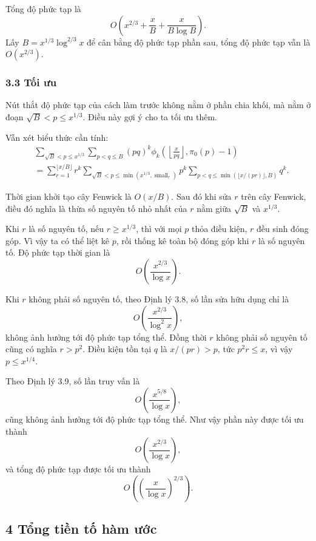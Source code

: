 \documentclass[11pt]{article}
\begin{document}
Tổng độ phức tạp là
\[
  O\left(x^{2/3}+\frac{x}{B}+\frac{x}{B\log B}\right).
\]
Lấy \(B=x^{1/3}\log^{2/3}x\) để cân bằng độ phức tạp phần sau, tổng độ phức tạp
vẫn là \(O(x^{2/3})\).

\subsubsection*{3.3 Tối ưu}

Nút thắt độ phức tạp của cách làm trước không nằm ở phần chia khối, mà nằm ở
đoạn \(\sqrt B<p\le x^{1/3}\). Điều này gợi ý cho ta tối ưu thêm.

Vẫn xét biểu thức cần tính:
\[
\begin{aligned}
&\sum_{\sqrt B<p\le x^{1/3}}\sum_{p<q\le B}
(pq)^k\phi_k\left(\left\lfloor\frac{x}{pq}\right\rfloor,\pi_0(p)-1\right)\\
&=\sum_{r=1}^{\lfloor x/B\rfloor}r^k
\sum_{\sqrt B<p\le\min(x^{1/3},\operatorname{small}_r)}
p^k
\sum_{p<q\le\min(\lfloor x/(pr)\rfloor,B)}q^k.
\end{aligned}
\]

Thời gian khởi tạo cây Fenwick là \(O(x/B)\). Sau đó khi sửa \(r\) trên cây
Fenwick, điều đó nghĩa là thừa số nguyên tố nhỏ nhất của \(r\) nằm giữa
\(\sqrt B\) và \(x^{1/3}\).

Khi \(r\) là số nguyên tố, nếu \(r\ge x^{1/3}\), thì với mọi \(p\) thỏa điều
kiện, \(r\) đều sinh đóng góp. Vì vậy ta có thể liệt kê \(p\), rồi thống kê
toàn bộ đóng góp khi \(r\) là số nguyên tố. Độ phức tạp thời gian là
\[
  O\left(\frac{x^{2/3}}{\log x}\right).
\]

Khi \(r\) không phải số nguyên tố, theo Định lý 3.8, số lần sửa hữu dụng chỉ là
\[
  O\left(\frac{x^{2/3}}{\log^2 x}\right),
\]
không ảnh hưởng tới độ phức tạp tổng thể. Đồng thời \(r\) không phải số nguyên
tố cũng có nghĩa \(r>p^2\). Điều kiện tồn tại \(q\) là \(x/(pr)>p\), tức
\(p^2r\le x\), vì vậy \(p\le x^{1/4}\).

Theo Định lý 3.9, số lần truy vấn là
\[
  O\left(\frac{x^{5/8}}{\log x}\right),
\]
cũng không ảnh hưởng tới độ phức tạp tổng thể. Như vậy phần này được tối ưu
thành
\[
  O\left(\frac{x^{2/3}}{\log x}\right),
\]
và tổng độ phức tạp được tối ưu thành
\[
  O\left(\left(\frac{x}{\log x}\right)^{2/3}\right).
\]

\subsection*{4 Tổng tiền tố hàm ước}
\end{document}
